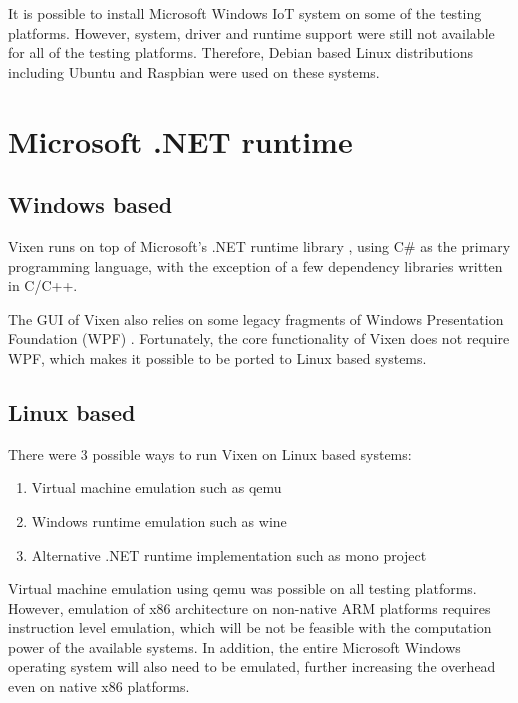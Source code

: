 It is possible to install Microsoft Windows IoT system on some of the testing platforms. However, system, driver and runtime support were still not available for all of the testing platforms. Therefore, Debian \cite{debian} based Linux distributions including Ubuntu \cite{ubuntu} and Raspbian \cite{raspbian} were used on these systems.

\section{Microsoft .NET runtime}

\subsection{Windows based}

Vixen runs on top of Microsoft's .NET runtime library \cite{platt2002introducing}, using C\# \cite{hejlsberg2003c} as the primary programming language, with the exception of a few dependency libraries written in C/C++.

The GUI of Vixen also relies on some legacy fragments of Windows Presentation Foundation (WPF) \cite{wpf}. Fortunately, the core functionality of Vixen does not require WPF, which makes it possible to be ported to Linux based systems.

\subsection{Linux based}

There were 3 possible ways to run Vixen on Linux based systems:

\begin{enumerate}
  \item Virtual machine emulation such as qemu \cite{qemu}
  \item Windows runtime emulation such as wine \cite{wine}
  \item Alternative .NET runtime implementation such as mono project \cite{de2004mono}
\end{enumerate}

Virtual machine emulation using qemu was possible on all testing platforms. However, emulation of x86 architecture on non-native ARM platforms requires instruction level emulation, which will be not be feasible with the computation power of the available systems. In addition, the entire Microsoft Windows operating system will also need to be emulated, further increasing the overhead even on native x86 platforms.

